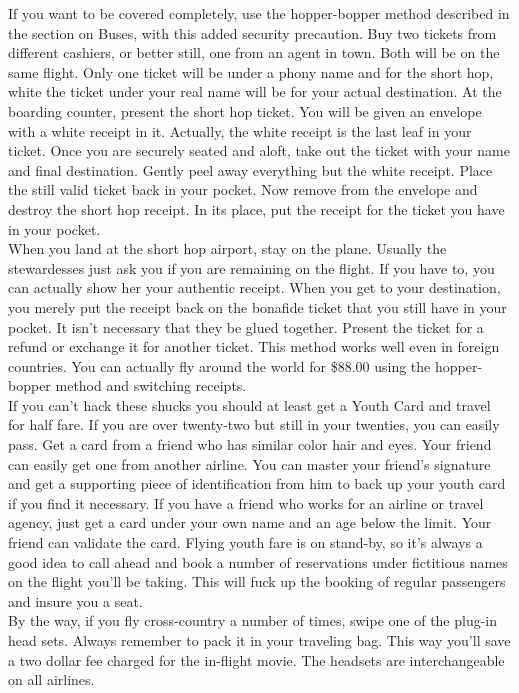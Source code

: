 \documentclass[11pt,twoside,a4paper]{book}
\begin{document}
If you want to be covered completely, use the hopper-bopper method described in the section on Buses, with this added security precaution. Buy two tickets from different cashiers, or better still, one from an agent in town. Both will be on the same flight. Only one ticket will be under a phony name and for the short hop, white the ticket under your real name will be for your actual destination. At the boarding counter, present the short hop ticket. You will be given an envelope with a white receipt in it. Actually, the white receipt is the last leaf in your ticket. Once you are securely seated and aloft, take out the ticket with your name and final destination. Gently peel away everything but the white receipt. Place the still valid ticket back in your pocket. Now remove from the envelope and destroy the short hop receipt. In its place, put the receipt for the ticket you have in your pocket.~\\

When you land at the short hop airport, stay on the plane. Usually the stewardesses just ask you if you are remaining on the flight. If you have to, you can actually show her your authentic receipt. When you get to your destination, you merely put the receipt back on the bonafide ticket that you still have in your pocket. It isn't necessary that they be glued together. Present the ticket for a refund or exchange it for another ticket. This method works well even in foreign countries. You can actually fly around the world for \$88.00 using the hopper-bopper method and switching receipts.~\\

If you can't hack these shucks you should at least get a Youth Card and travel for half fare. If you are over twenty-two but still in your twenties, you can easily pass. Get a card from a friend who has similar color hair and eyes. Your friend can easily get one from another airline. You can master your friend's signature and get a supporting piece of identification from him to back up your youth card if you find it necessary. If you have a friend who works for an airline or travel agency, just get a card under your own name and an age below the limit. Your friend can validate the card. Flying youth fare is on stand-by, so it's always a good idea to call ahead and book a number of reservations under fictitious names on the flight you'll be taking. This will fuck up the booking of regular passengers and insure you a seat.~\\

By the way, if you fly cross-country a number of times, swipe one of the plug-in head sets. Always remember to pack it in your traveling bag. This way you'll save a two dollar fee charged for the in-flight movie. The headsets are interchangeable on all airlines.~\\
\end{document}
